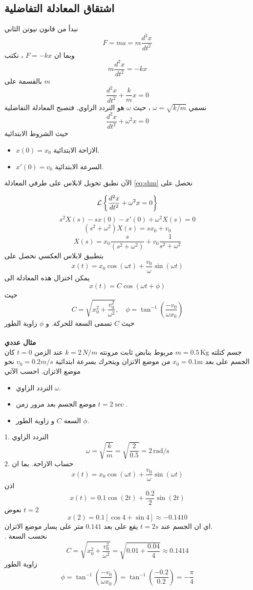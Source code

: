 \subsection*{اشتقاق المعادلة التفاضلية}
نبدأ من قانون نيوتن الثاني
\[
F = ma = m \frac{d^2 x}{dt^2}
\]
وبما ان $F = -kx$ ، نكتب
\[
m \frac{d^2 x}{dt^2} = - kx
\]
بالقسمة على $m$
\[
\frac{d^2 x}{dt^2} + \frac{k}{m} x = 0
\]
نسمي $\omega =\sqrt{ k/m}$ ، حيث $\omega$ هو التردد الزاوي. فتصبح المعادلة التفاضلية
\begin{equation}
	\label{eq:shm}
	\frac{d^2 x}{dt^2} + \omega^2 x = 0
\end{equation}
حيث الشروط الابتدائية
\begin{itemize}
	\item $x(0) = x_0$ الازاحة الابتدائية.
	\item $x'(0) = v_0$ السرعة الابتدائية.
\end{itemize}
الآن نطبق تحويل لابلاس على طرفي المعادلة \eqref{eq:shm} نحصل على

\[
\mathcal{L}\left\{\frac{d^2 x}{dt^2} + \omega^2 x = 0 \right\}
\]
\[
s^2X(s) - sx(0) - x'(0) + \omega^2 X(s)=0
\]
\[
(s^2 + \omega^2 ) X(s) = sx_0 + v_0 
\]
\[
X(s) = x_0\frac{s}{(s^2 + \omega^2 )} + v_0 \frac{1}{s^2 + \omega^2}
\]
بتطبيق لابلاس العكسي نحصل على 
\[
x(t) = x_0\cos(\omega t) + \frac{v_0}{\omega} \sin(\omega t)
\]
يمكن اختزال هذه المعادلة الى 
\[
x(t) = C \cos(\omega t + \phi)
\]
حيث 
\[
C = \sqrt{x_0^2 + \frac{v_0^2}{\omega^2}}, \quad \phi=\tan^{-1} \left(\frac{-v_0}{\omega x_0}\right)
\]
حيث $C$ تسمى السعة للحركة. و $\phi$ زاوية الطور\\ \\
\noindent
\textbf{مثال عددي}\\
جسم كتلته $m = 0.5 \, \text{Kg}$ مربوط بنابض ثابت مرونته $k = 2\, N/m$ عند الزمن $t=0$ كان الجسم على بعد $x_0=0.1\text{m}$ من موضع الاتزان ويتحرك بسرعة ابتدائية $v_0 = 0.2 m/s$ نحو موضع الاتزان. احسب الآتي
\begin{itemize}
	\item التردد الزاوي $\omega$.
	\item موضع الجسم بعد مرور زمن $t = 2\sec$.
	\item السعة $C$ و زاوية الطور  $\phi$.
\end{itemize}
\begin{solution}
	1. التردد الزاوي
	\[
	\omega = \sqrt{\frac{k}{m}} = \sqrt{\frac{2}{0.5}} = 2 \, \text{rad}/\text{s}
	\]
	2. حساب الازاحة. بما ان 
	\[
	x(t) =  x_0\cos(\omega t) + \frac{v_0}{\omega} \sin(\omega t)
	\]
	اذن
	\[
	x(t) =  0.1\cos(2 t) + \frac{0.2}{2} \sin(2 t)
	\]
	نعوض $t=2$
	\[
	x(2) = 0.1 [\cos 4 + \sin 4] \approx  -0.1410 
	\]
	اي ان الجسم عند $t=2 s$ يقع على بعد $0.141$ متر على يسار موضع الاتزان.\\ 
	. نحسب السعة 
	\[
	C = \sqrt{x_0^2 + \frac{v_0^2}{\omega^2}} = \sqrt{0.01 + \frac{0.04}{4}} \approx 0.1414
	\]
	زاوية الطور
	\[
\phi=\tan^{-1} \left(\frac{-v_0}{\omega x_0}\right) = \tan^{-1} \left(\frac{-0.2}{0.2}\right) = - \frac{\pi}{4}
	\]
\end{solution}